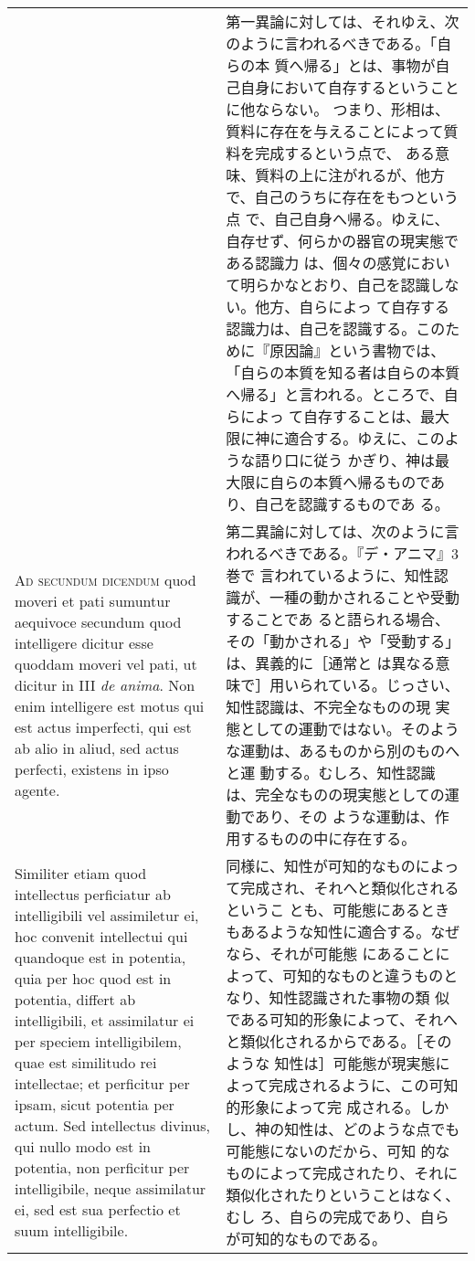 \documentclass[10pt]{jsarticle} %
\begin{document}
\begin{longtable}{p{21em}p{21em}}
&


第一異論に対しては、それゆえ、次のように言われるべきである。「自らの本
質へ帰る」とは、事物が自己自身において自存するということに他ならない。
つまり、形相は、質料に存在を与えることによって質料を完成するという点で、
ある意味、質料の上に注がれるが、他方で、自己のうちに存在をもつという点
で、自己自身へ帰る。ゆえに、自存せず、何らかの器官の現実態である認識力
は、個々の感覚において明らかなとおり、自己を認識しない。他方、自らによっ
て自存する認識力は、自己を認識する。このために『原因論』という書物では、
「自らの本質を知る者は自らの本質へ帰る」と言われる。ところで、自らによっ
て自存することは、最大限に神に適合する。ゆえに、このような語り口に従う
かぎり、神は最大限に自らの本質へ帰るものであり、自己を認識するものであ
る。

\\


{\scshape Ad secundum dicendum} quod moveri et pati sumuntur aequivoce
secundum quod intelligere dicitur esse quoddam moveri vel pati, ut
dicitur in III {\itshape de anima}. Non enim intelligere est motus qui
est actus imperfecti, qui est ab alio in aliud, sed actus perfecti,
existens in ipso agente. 

&

第二異論に対しては、次のように言われるべきである。『デ・アニマ』3巻で
言われているように、知性認識が、一種の動かされることや受動することであ
ると語られる場合、その「動かされる」や「受動する」は、異義的に［通常と
は異なる意味で］用いられている。じっさい、知性認識は、不完全なものの現
実態としての運動ではない。そのような運動は、あるものから別のものへと運
動する。むしろ、知性認識は、完全なものの現実態としての運動であり、その
ような運動は、作用するものの中に存在する。


\\

Similiter etiam quod intellectus perficiatur ab
intelligibili vel assimiletur ei, hoc convenit intellectui qui quandoque
est in potentia, quia per hoc quod est in potentia, differt ab
intelligibili, et assimilatur ei per speciem intelligibilem, quae est
similitudo rei intellectae; et perficitur per ipsam, sicut potentia per
actum. Sed intellectus divinus, qui nullo modo est in potentia, non
perficitur per intelligibile, neque assimilatur ei, sed est sua
perfectio et suum intelligibile.


&


同様に、知性が可知的なものによって完成され、それへと類似化されるというこ
とも、可能態にあるときもあるような知性に適合する。なぜなら、それが可能態
にあることによって、可知的なものと違うものとなり、知性認識された事物の類
似である可知的形象によって、それへと類似化されるからである。［そのような
知性は］可能態が現実態によって完成されるように、この可知的形象によって完
成される。しかし、神の知性は、どのような点でも可能態にないのだから、可知
的なものによって完成されたり、それに類似化されたりということはなく、むし
ろ、自らの完成であり、自らが可知的なものである。



\end{longtable}
\end{document}
